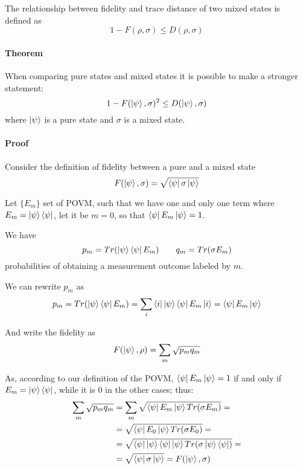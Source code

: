 \documentclass{masterthesis}
\begin{document}
The relationship between fidelity and trace distance of two mixed states is defined as
\begin{equation}
    1 - F(\rho, \sigma) \leq D(\rho, \sigma)
\end{equation}

\paragraph*{Theorem}
When comparing pure states and mixed states it is possible to make a stronger statement:
\begin{equation}
    1 - F(\ket{\psi}, \sigma)^2 \leq D(\ket{\psi}, \sigma)
\end{equation}
where $\ket{\psi}$ is a pure state and $\sigma$ is a mixed state.

\paragraph*{Proof}
Consider the definition of fidelity between a pure and a mixed state
\begin{equation}
    F(\ket{\psi}, \sigma) = \sqrt{\bra{\psi}\sigma\ket{\psi}}
\end{equation}

Let $\{E_m\}$ set of POVM, such that we have one and only one term where $E_m = \ket{\psi}\bra{\psi}$, let it be $m=0$, so that $\bra{\psi}E_m\ket{\psi} = 1$. 

We have
\begin{equation}
    p_m = Tr(\ket{\psi}\bra{\psi} E_m) \quad \quad q_m = Tr(\sigma E_m)
\end{equation}
probabilities of obtaining a measurement outcome labeled by $m$.

We can rewrite $p_m$ as
\begin{equation}
    p_m = Tr(\ket{\psi}\bra{\psi} E_m) = \sum_{i} \bra{i} \ket{\psi}\bra{\psi} E_m \ket{i} = \bra{\psi}E_m\ket{\psi}
\end{equation}

And write the fidelity as
\begin{equation}
    F(\ket{\psi}, \rho) = \sum_{m} \sqrt{p_m q_m} 
\end{equation}

As, according to our definition of the POVM, $\bra{\psi}E_m\ket{\psi} = 1$ if and only if $E_m = \ket{\psi}\bra{\psi}$, while it is 0 in the other cases; thus:
\begin{align}
    \sum_{m} \sqrt{p_m q_m} &= \sum_{m} \sqrt{\bra{\psi}E_m\ket{\psi} Tr(\sigma E_m)} = \\
    &= \sqrt{\bra{\psi}E_0\ket{\psi} Tr(\sigma E_0)} = \\
    &= \sqrt{\bra{\psi}\ket{\psi}\bra{\psi}\ket{\psi} Tr(\sigma \ket{\psi}\bra{\psi})} = \\
    &= \sqrt{\bra{\psi} \sigma \ket{\psi}} = F(\ket{\psi}, \sigma)
\end{align}
\end{document}
